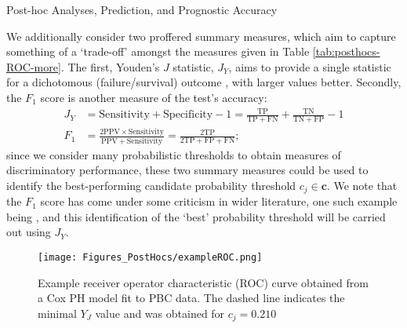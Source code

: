 \begin{chapter}{\label{cha:posthoc}Post-hoc Analyses, Prediction, and Prognostic Accuracy}
\begin{table}[t]
\label{tab:posthocs-ROC-more}
\end{table}
We additionally consider two proffered summary measures, which aim to capture something of a `trade-off' amongst the measures given in Table \ref{tab:posthocs-ROC-more}. The first, Youden's $J$ statistic, $J_Y$, aims to provide a single statistic for a dichotomous (\ie failure/survival) outcome \citep{Youden1950}, with larger values better. Secondly, the $F_1$ score is another measure of the test's accuracy:
\begin{equation}
    \begin{aligned}
        J_Y &= \mathrm{Sensitivity} + \mathrm{Specificity} - 1 = \frac{\mathrm{TP}}{\mathrm{TP}+\mathrm{FN}} + \frac{\mathrm{TN}}{\mathrm{TN}+\mathrm{FP}} - 1\\
        F_1 &= \frac{2\mathrm{PPV} \times \mathrm{Sensitivity}}{\mathrm{PPV}+\mathrm{Sensitivity}} = \frac{2\mathrm{TP}}{2\mathrm{TP}+\mathrm{FP+\mathrm{FN}}};
    \end{aligned}
\label{eq:posthoc-youden-F1}
\end{equation}
since we consider many probabilistic thresholds to obtain measures of discriminatory performance, these two summary measures could be used to identify the best-performing candidate probability threshold $c_j\in\bm{c}$. We note that the $F_1$ score has come under some criticism in wider literature, one such example being \citet{Fscorebad}, and this identification of the `best' probability threshold will be carried out using $J_Y$. 
\begin{figure}
    \centering
    \texttt{[image: Figures\_PostHocs/exampleROC.png]}
    \caption{Example receiver operator characteristic (ROC) curve obtained from a Cox PH model fit to PBC data. The dashed line indicates the minimal $Y_J$ value and was obtained for $c_j = 0.210$}
    \label{fig:posthocs-example-ROC}
\end{figure}


\end{chapter}
